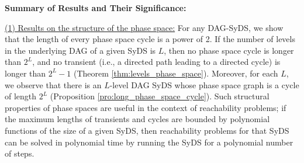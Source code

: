 \smallskip

\noindent
\textbf{Summary of Results and Their Significance:}

\smallskip

\noindent
\underline{(1) Results on the structure of the phase space:}
For any DAG-SyDS, we show that
the length of every phase space cycle is a power of 2.
If the number of levels in the underlying DAG of a given SyDS is $L$,
then no phase space cycle is longer than $2^L$,
and no transient (i.e., a directed path leading to a directed
cycle) is longer than $2^L-1$
(Theorem \ref{thm:levels_phase_space}).
Moreover, for each $L$, we observe that
there is an $L$-level DAG SyDS whose phase 
space graph is a cycle of length $2^L$
(Proposition \ref{pro:long_phase_space_cycle}).
Such structural properties of phase spaces are useful in the context of
reachability problems; if the maximum lengths of transients
and cycles are bounded by polynomial functions of the size of a given SyDS,
then reachability problems for that SyDS can be solved in polynomial time
by running the SyDS for a polynomial number of steps.

\smallskip

